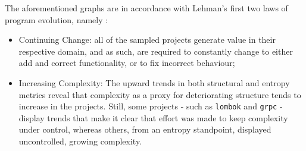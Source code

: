 \documentclass[10pt,conference]{IEEEtran}
\begin{document}
The aforementioned graphs are in accordance with Lehman's first two laws of program evolution, namely \cite{lehman1980laws}:
\begin{itemize}
    \item Continuing Change: all of the sampled projects generate value in their respective domain, and as such, are required to constantly change to either add and correct functionality, or to fix incorrect behaviour;
    \item Increasing Complexity: The upward trends in both structural and entropy metrics reveal that complexity as a proxy for deteriorating structure tends to increase in the projects. Still, some projects - such as \texttt{lombok} and \texttt{grpc} - display trends that make it clear that effort was made to keep complexity under control, whereas others, from an entropy standpoint, displayed uncontrolled, growing complexity.
\end{itemize}
\end{document}
